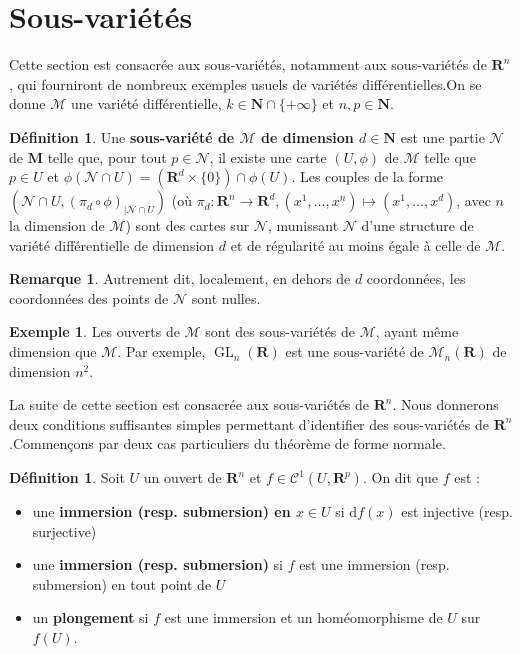 \documentclass[12pt,a4paper]{article}
\DeclareMathOperator{\GL}{GL}
\theoremstyle{definition}
\newtheorem{defn}[thm]{Définition}
\newtheorem{ex}[thm]{Exemple}
\newtheorem{rqe}[thm]{Remarque}
\begin{document}
\section{Sous-variétés}
Cette section est consacrée aux sous-variétés, notamment aux sous-variétés de $\mathbf{R}^n$, qui fourniront de nombreux exemples usuels de variétés différentielles.\newline On se donne $\mathcal{M}$ une variété différentielle, $k\in\mathbf{N}\cap\{+\infty\}$ et $n,p\in\mathbf{N}$.
\begin{defn}
Une \textbf{sous-variété de $\mathcal{M}$ de dimension $d\in\mathbf{N}$} est une partie $\mathcal{N}$ de $\mathbf{M}$ telle que, pour tout $p\in\mathcal{N}$, il existe une carte $(U,\phi)$ de $\mathcal{M}$ telle que $p\in U$ et $\phi(\mathcal{N}\cap U)=(\mathbf{R}^d\times\{0\})\cap\phi(U)$. Les couples de la forme $(\mathcal{N}\cap U,(\pi_{d}\circ\phi)_{|\mathcal{N}\cap U})$ (où $\pi_d:\mathbf{R}^n\to\mathbf{R}^d,(x^1,\ldots,x^n)\mapsto (x^1,\ldots,x^d)$, avec $n$ la dimension de $\mathcal{M}$) sont des cartes sur $\mathcal{N}$, munissant $\mathcal{N}$ d'une structure de variété différentielle de dimension $d$ et de régularité au moins égale à celle de $\mathcal{M}$.
\end{defn}
\begin{rqe}
Autrement dit, localement, en dehors de $d$ coordonnées, les coordonnées des points de $\mathcal{N}$ sont nulles.
\end{rqe}
\begin{ex}
Les ouverts de $\mathcal{M}$ sont des sous-variétés de $\mathcal{M}$, ayant même dimension que $\mathcal{M}$. Par exemple, $\GL_n(\mathbf{R})$ est une sous-variété de $\mathcal{M}_n(\mathbf{R})$ de dimension $n^2$.
\end{ex}
La suite de cette section est consacrée aux sous-variétés de $\mathbf{R}^n$. Nous donnerons deux conditions suffisantes simples permettant d'identifier des sous-variétés de $\mathbf{R}^n$.\newline Commençons par deux cas particuliers du théorème de forme normale.
\begin{defn}
Soit $U$ un ouvert de $\mathbf{R}^n$ et $f\in\mathcal{C}^1(U,\mathbf{R}^p)$. On dit que $f$ est :
\begin{itemize}
\item une \textbf{immersion (resp. submersion) en $x\in U$} si $\mathrm{d}f(x)$ est injective (resp. surjective)
\item une \textbf{immersion (resp. submersion)} si $f$ est une immersion (resp. submersion) en tout point de $U$
\item un \textbf{plongement} si $f$ est une immersion et un homéomorphisme de $U$ sur $f(U)$.
\end{itemize}
\end{defn}
\end{document}
